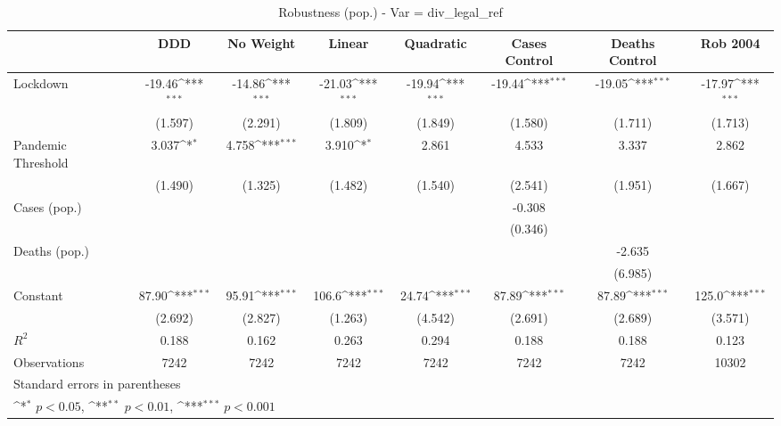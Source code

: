 \documentclass{article}
\begin{document}
{
\def\sym#1{\ifmmode^{#1}\else\(^{#1}\)\fi}
\begin{longtable}{l*{7}{c}}
\caption{Robustness (pop.) - Var = div\_legal\_ref}\\
\hline\hline\endfirsthead\hline\endhead\hline\endfoot\endlastfoot
                &\multicolumn{1}{c}{DDD}&\multicolumn{1}{c}{No Weight}&\multicolumn{1}{c}{Linear}&\multicolumn{1}{c}{Quadratic}&\multicolumn{1}{c}{Cases Control}&\multicolumn{1}{c}{Deaths Control}&\multicolumn{1}{c}{Rob 2004}\\
\hline
Lockdown        &   -19.46\sym{***}&   -14.86\sym{***}&   -21.03\sym{***}&   -19.94\sym{***}&   -19.44\sym{***}&   -19.05\sym{***}&   -17.97\sym{***}\\
                &  (1.597)         &  (2.291)         &  (1.809)         &  (1.849)         &  (1.580)         &  (1.711)         &  (1.713)         \\
Pandemic Threshold&    3.037\sym{*}  &    4.758\sym{***}&    3.910\sym{*}  &    2.861         &    4.533         &    3.337         &    2.862         \\
                &  (1.490)         &  (1.325)         &  (1.482)         &  (1.540)         &  (2.541)         &  (1.951)         &  (1.667)         \\
Cases (pop.)    &                  &                  &                  &                  &   -0.308         &                  &                  \\
                &                  &                  &                  &                  &  (0.346)         &                  &                  \\
Deaths (pop.)   &                  &                  &                  &                  &                  &   -2.635         &                  \\
                &                  &                  &                  &                  &                  &  (6.985)         &                  \\
Constant        &    87.90\sym{***}&    95.91\sym{***}&    106.6\sym{***}&    24.74\sym{***}&    87.89\sym{***}&    87.89\sym{***}&    125.0\sym{***}\\
                &  (2.692)         &  (2.827)         &  (1.263)         &  (4.542)         &  (2.691)         &  (2.689)         &  (3.571)         \\
\hline
\(R^{2}\)       &    0.188         &    0.162         &    0.263         &    0.294         &    0.188         &    0.188         &    0.123         \\
Observations    &     7242         &     7242         &     7242         &     7242         &     7242         &     7242         &    10302         \\
\hline\hline
\multicolumn{8}{l}{\footnotesize Standard errors in parentheses}\\
\multicolumn{8}{l}{\footnotesize \sym{*} \(p<0.05\), \sym{**} \(p<0.01\), \sym{***} \(p<0.001\)}\\
\end{longtable}
}
\end{document}
